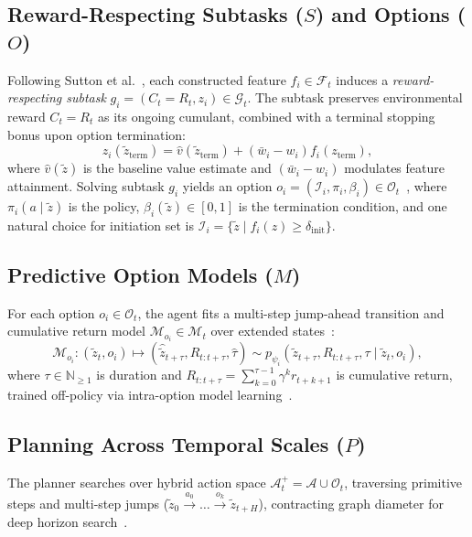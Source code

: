 \documentclass{article}
\theoremstyle{definition}
\begin{document}
{\subsection{Reward-Respecting Subtasks \texorpdfstring{($S$)}{(S)} and Options \texorpdfstring{($O$)}{(O)}}
Following Sutton et al.~\citep{sutton2023subtasks}, each constructed feature $f_i \in \mathcal{F}_t$ induces a \emph{reward-respecting subtask} $g_i = (C_t = R_t, z_i) \in \mathcal{G}_t$. The subtask preserves environmental reward $C_t = R_t$ as its ongoing cumulant, combined with a terminal stopping bonus upon option termination:
\begin{equation}
\label{eq:reward_respecting_subtask}
z_i(\tilde{z}_{\text{term}}) = \hat{v}(\tilde{z}_{\text{term}}) + (\bar{w}_i - w_i) f_i(z_{\text{term}}),
\end{equation}
where $\hat{v}(\tilde{z})$ is the baseline value estimate and $(\bar{w}_i - w_i)$ modulates feature attainment. Solving subtask $g_i$ yields an option $o_i = (\mathcal{I}_i, \pi_i, \beta_i) \in \mathcal{O}_t$~\citep{sutton1999between}, where $\pi_i(a \mid \tilde{z})$ is the policy, $\beta_i(\tilde{z}) \in [0, 1]$ is the termination condition, and one natural choice for initiation set is $\mathcal{I}_i = \{\tilde{z} \mid f_i(z) \ge \delta_{\text{init}}\}$.

\subsection{Predictive Option Models \texorpdfstring{($M$)}{(M)}}
For each option $o_i \in \mathcal{O}_t$, the agent fits a multi-step jump-ahead transition and cumulative return model $\mathcal{M}_{o_i} \in \mathcal{M}_t$ over extended states~\citep{sutton1998intra, freed2023learning, rodriguez2024learning}:
\begin{equation}
\label{eq:option_model}
\mathcal{M}_{o_i}: (\tilde{z}_t, o_i) \mapsto (\hat{\tilde{z}}_{t+\tau}, \hat{R}_{t:t+\tau}, \hat{\tau}) \sim p_{\psi_i}(\tilde{z}_{t+\tau}, R_{t:t+\tau}, \tau \mid \tilde{z}_t, o_i),
\end{equation}
where $\tau \in \mathbb{N}_{\ge 1}$ is duration and $R_{t:t+\tau} = \sum_{k=0}^{\tau-1} \gamma^k r_{t+k+1}$ is cumulative return, trained off-policy via intra-option model learning~\citep{sutton1998intra}.

\subsection{Planning Across Temporal Scales \texorpdfstring{($P$)}{(P)}}
The planner searches over hybrid action space $\mathcal{A}^+_t = \mathcal{A} \cup \mathcal{O}_t$, traversing primitive steps and multi-step jumps ($\tilde{z}_0 \xrightarrow{a_0} \dots \xrightarrow{o_k} \tilde{z}_{t+H}$), contracting graph diameter for deep horizon search~\citep{jiralerspong2023forecaster, precup1997planning}.
}
\end{document}
